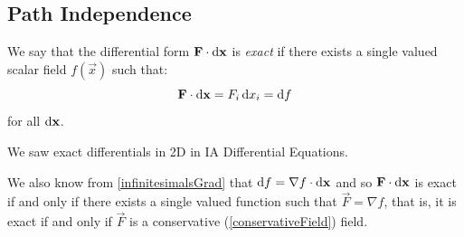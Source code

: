\documentclass[../main.tex]{subfiles}
\begin{document}
\subsection{Path Independence}
\begin{definition}
  We say that the differential form $\vec{F} \cdot \d{\vec{x}}$ is \textit{exact} if there exists a single valued scalar field $f(\vec{x})$ such that:
  \[
    \vec{F} \cdot \d{\vec{x}} = F_i \d{x_i} = \d{f}
  \]
  for all $\d{\vec{x}}$.
\end{definition}
\begin{remark}[Recap]
  We saw exact differentials in 2D in IA Differential Equations.
\end{remark}
We also know from \cref{infinitesimalsGrad} that $\d{f} = \nabla f \cdot \d{\vec{x}}$ and so $\vec{F} \cdot \d{\vec{x}}$ is exact if and only if there exists a single valued function such that $\vec{F} = \nabla f$, that is, it is exact if and only if $\vec{F}$ is a conservative (\cref{conservativeField}) field.
\end{document}
